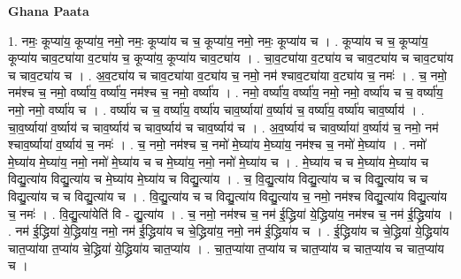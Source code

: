 \documentclass[17pt]{extarticle}
\begin{document}
\textbf{Ghana Paata } \newline

1. नमः॒ कूप्या॑य॒ कूप्या॑य॒ नमो॒ नमः॒ कूप्या॑य च च॒ कूप्या॑य॒ नमो॒ नमः॒ कूप्या॑य च । . कूप्या॑य च च॒ कूप्या॑य॒ कूप्या॑य चाव॒ट्या॑या व॒ट्या॑य च॒ कूप्या॑य॒ कूप्या॑य चाव॒ट्या॑य । . चा॒व॒ट्या॑या व॒ट्या॑य च चाव॒ट्या॑य च चाव॒ट्या॑य च चाव॒ट्या॑य च । . अ॒व॒ट्या॑य च चाव॒ट्या॑या व॒ट्या॑य च॒ नमो॒ नम॑ श्चाव॒ट्या॑या व॒ट्या॑य च॒ नमः॑ । . च॒ नमो॒ नम॑श्च च॒ नमो॒ वर्ष्या॑य॒ वर्ष्या॑य॒ नम॑श्च च॒ नमो॒ वर्ष्या॑य । . नमो॒ वर्ष्या॑य॒ वर्ष्या॑य॒ नमो॒ नमो॒ वर्ष्या॑य च च॒ वर्ष्या॑य॒ नमो॒ नमो॒ वर्ष्या॑य च । . वर्ष्या॑य च च॒ वर्ष्या॑य॒ वर्ष्या॑य चाव॒र्ष्याया॑ व॒र्ष्याय॑ च॒ वर्ष्या॑य॒ वर्ष्या॑य चाव॒र्ष्याय॑ । . चा॒व॒र्ष्याया॑ व॒र्ष्याय॑ च चाव॒र्ष्याय॑ च चाव॒र्ष्याय॑ च चाव॒र्ष्याय॑ च । . अ॒व॒र्ष्याय॑ च चाव॒र्ष्याया॑ व॒र्ष्याय॑ च॒ नमो॒ नम॑ श्चाव॒र्ष्याया॑ व॒र्ष्याय॑ च॒ नमः॑ । . च॒ नमो॒ नम॑श्च च॒ नमो॑ मे॒घ्या॑य मे॒घ्या॑य॒ नम॑श्च च॒ नमो॑ मे॒घ्या॑य । . नमो॑ मे॒घ्या॑य मे॒घ्या॑य॒ नमो॒ नमो॑ मे॒घ्या॑य च च मे॒घ्या॑य॒ नमो॒ नमो॑ मे॒घ्या॑य च । . मे॒घ्या॑य च च मे॒घ्या॑य मे॒घ्या॑य च विद्यु॒त्या॑य विद्यु॒त्या॑य च मे॒घ्या॑य मे॒घ्या॑य च विद्यु॒त्या॑य । . च॒ वि॒द्यु॒त्या॑य विद्यु॒त्या॑य च च विद्यु॒त्या॑य च च विद्यु॒त्या॑य च च विद्यु॒त्या॑य च । . वि॒द्यु॒त्या॑य च च विद्यु॒त्या॑य विद्यु॒त्या॑य च॒ नमो॒ नम॑श्च विद्यु॒त्या॑य विद्यु॒त्या॑य च॒ नमः॑ । . वि॒द्यु॒त्या॑येति॑ वि - द्यु॒त्या॑य । . च॒ नमो॒ नम॑श्च च॒ नम॑ ई॒द्ध्रिया॑ ये॒द्ध्रिया॑य॒ नम॑श्च च॒ नम॑ ई॒द्ध्रिया॑य । . नम॑ ई॒द्ध्रिया॑ ये॒द्ध्रिया॑य॒ नमो॒ नम॑ ई॒द्ध्रिया॑य च चे॒द्ध्रिया॑य॒ नमो॒ नम॑ ई॒द्ध्रिया॑य च । . ई॒द्ध्रिया॑य च चे॒द्ध्रिया॑ ये॒द्ध्रिया॑य चात॒प्या॑या त॒प्या॑य चे॒द्ध्रिया॑ ये॒द्ध्रिया॑य चात॒प्या॑य । . चा॒त॒प्या॑या त॒प्या॑य च चात॒प्या॑य च चात॒प्या॑य च चात॒प्या॑य च । \newline
\end{document}
